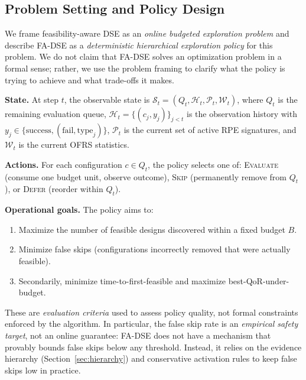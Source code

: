 \documentclass[journal]{IEEEtran}
\begin{document}
\subsection{Problem Setting and Policy Design}
\label{sec:formulation}

We frame feasibility-aware DSE as an \emph{online budgeted exploration problem} and describe FA-DSE as a \emph{deterministic hierarchical exploration policy} for this problem. We do not claim that FA-DSE solves an optimization problem in a formal sense; rather, we use the problem framing to clarify what the policy is trying to achieve and what trade-offs it makes.

\textbf{State.} At step $t$, the observable state is $\mathcal{S}_t = (Q_t, \mathcal{H}_t, \mathcal{P}_t, \mathcal{W}_t)$, where $Q_t$ is the remaining evaluation queue, $\mathcal{H}_t = \{(c_j, y_j)\}_{j<t}$ is the observation history with $y_j \in \{\text{success}, (\text{fail}, \text{type}_j)\}$, $\mathcal{P}_t$ is the current set of active RPE signatures, and $\mathcal{W}_t$ is the current OFRS statistics.

\textbf{Actions.} For each configuration $c \in Q_t$, the policy selects one of: \textsc{Evaluate} (consume one budget unit, observe outcome), \textsc{Skip} (permanently remove from $Q_t$), or \textsc{Defer} (reorder within $Q_t$).

\textbf{Operational goals.} The policy aims to:
\begin{enumerate}
    \item Maximize the number of feasible designs discovered within a fixed budget $B$.
    \item Minimize false skips (configurations incorrectly removed that were actually feasible).
    \item Secondarily, minimize time-to-first-feasible and maximize best-QoR-under-budget.
\end{enumerate}
These are \emph{evaluation criteria} used to assess policy quality, not formal constraints enforced by the algorithm. In particular, the false skip rate is an \emph{empirical safety target}, not an online guarantee: FA-DSE does not have a mechanism that provably bounds false skips below any threshold. Instead, it relies on the evidence hierarchy (Section~\ref{sec:hierarchy}) and conservative activation rules to keep false skips low in practice.
\end{document}
